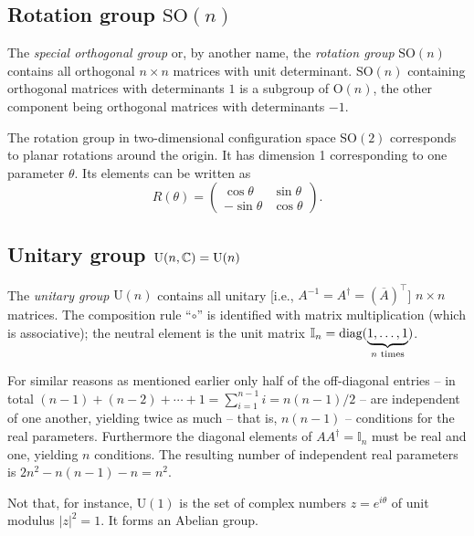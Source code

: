 \subsection{Rotation group $\textrm{SO}(n)$}

The {\em special orthogonal group} or, by another name, the {\em rotation group} $\textrm{SO}(n)$
contains all  orthogonal
$n\times n$ matrices with unit determinant.
$\textrm{SO}(n)$ containing orthogonal matrices with determinants $1$ is a subgroup of $\textrm{O}(n)$,
the other component being orthogonal matrices with determinants $-1$.

The rotation group in two-dimensional configuration space  $\textrm{SO}(2)$
corresponds to planar rotations around the origin. It has dimension 1 corresponding to one parameter $\theta$.
Its elements can be written as
\begin{equation}
R(\theta )  =
\begin{pmatrix}
\cos \theta & \sin \theta\\
- \sin \theta  & \cos \theta
\end{pmatrix}
.
\end{equation}




\subsection{Unitary group  $\textrm{U}(n,{\Bbb C}) = \textrm{U}(n)$}

The {\em unitary group}\cite{murnaghan} $\textrm{U}(n)$
contains all  unitary [i.e., $  A  ^{-1}=  A  ^\dagger =(\overline{  A  })^\intercal $]
$n\times n$ matrices.
The composition rule ``$\circ$''
is identified with matrix multiplication (which is associative); the neutral element is the unit
matrix ${\Bbb I}_n=\textrm{diag}(\underbrace{1,\ldots ,1}_{n \textrm{ times}})$.

For similar reasons as mentioned earlier only half of the off-diagonal entries
-- in total $(n-1) + (n-2)+  \cdots +1= \sum_{i=1}^{n-1} i= n(n-1)/2$ --
are independent of one another, yielding twice as much -- that is, $n(n-1)$ --
conditions for the real parameters.
Furthermore
the diagonal elements of
$  A  A  ^\dagger = {\mathbb {I}}_n$
must be real and one, yielding $n$ conditions.
The resulting number of independent real parameters is $2 n^2 - n(n-1) - n =n^2$.

Not that, for instance,
$\textrm{U}(1)$ is the set of complex numbers $z=e^{i\theta}$ of unit modulus  $|z|^2=1$. It forms an Abelian group.

